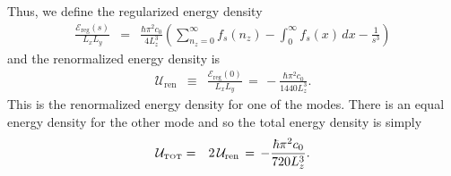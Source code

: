 \documentclass[sections]{tjwNOTES}
\newcommand\man[1]{\mathcal{#1}}
\newcommand\nz{n_{z}}
\newcommand\Lx{L_{x}}
\newcommand\Ly{L_{y}}
\newcommand\Lz{L_{z}}
\begin{document}
Thus, we define the regularized energy density
\begin{eqnarray*}
    \frac{\man{E}_{\text{reg}}(s)}{\Lx\Ly} &=& \frac{\hbar \pi^{2} c_{0}}{4\Lz^{3}}\left( \sum_{\nz=0}^{\infty} f_{s}(\nz) - \int_{0}^{\infty}f_{s}(x)\,dx - \frac{1}{s^{3}}\right)
\end{eqnarray*}
and the renormalized energy density is
\begin{eqnarray*}
    \man{U}_{\text{ren}} &\equiv& \frac{\man{E}_{\text{reg}}(0)}{\Lx\Ly} \,=\, -\frac{\hbar \pi^{2} c_{0}}{1440\Lz^{3}}.
\end{eqnarray*}
This is the renormalized energy density for one of the modes. There is an equal energy density for the other mode and so the total energy density is simply
\begin{eqnarray*}
    \man{U}_{\mbox{\tiny TOT}} &=& 2\,\man{U}_{\text{ren}} \,=\, -\frac{\hbar \pi^{2} c_{0}}{720\Lz^{3}}.
\end{eqnarray*}


\end{document}
